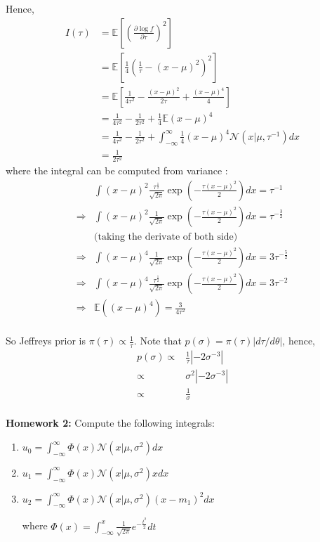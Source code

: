 \documentclass[11pt]{article}
\def\MN{{\mathcal N}}
\def\BE{{\mathbb E}}
\begin{document}
\begin{description}
Hence, 
\[\begin{split}
I(\tau) &= \BE\left[\left( \frac{\partial \log f}{\partial \tau} \right)^2\right]  \\
&= \BE\left[ \frac{1}{4} \left( \frac{1}{\tau} - (x-\mu)^2 \right)^2  \right] \\
&= \BE\left[ \frac{1}{4\tau^2} - \frac{(x - \mu)^2}{2\tau} + \frac{(x-\mu)^4}{4} \right] \\
&= \frac{1}{4\tau^2} - \frac{1}{2\tau^2} + \frac{1}{4}\BE(x-\mu)^4 \\
&= \frac{1}{4\tau^2}-\frac{1}{2\tau^2} + \int^\infty_{-\infty} \frac{1}{4}(x - \mu)^4\MN(x|\mu, \tau^{-1})dx \\
&= \frac{1}{2\tau^2}
\end{split}\]
where the integral can be computed from variance :
\[\begin{split}
& \int (x-\mu)^2\frac{\tau^{\frac{1}{2}}}{\sqrt{2\pi}}\exp(-\frac{\tau(x-\mu)^2}{2})dx =  \tau^{-1} \\
\Longrightarrow & \int (x-\mu)^2\frac{1}{\sqrt{2\pi}}\exp(-\frac{\tau(x-\mu)^2}{2})dx =  \tau^{-\frac{3}{2}} \\ 
& \mbox{(taking the derivate of both side)} \\
\Longrightarrow & \int (x-\mu)^4\frac{1}{\sqrt{2\pi}}\exp(-\frac{\tau(x-\mu)^2}{2})dx =  3\tau^{-\frac{5}{2}} \\ 
\Longrightarrow & \int (x-\mu)^4\frac{\tau^{\frac{1}{2}}}{\sqrt{2\pi}}\exp(-\frac{\tau(x-\mu)^2}{2})dx =  3\tau^{-2} \\ 
\Longrightarrow & \BE\left((x-\mu)^4\right) = \frac{3}{4\tau^2} \\
\end{split}\]

So Jeffreys prior is $\pi(\tau) \propto\frac{1}{\tau}$.
Note that $p(\sigma)=\pi(\tau)|d\tau/d\theta|$, hence, 
\begin{eqnarray*}
p(\sigma)
\propto &\frac{1}{\tau}|-2\sigma^{-3}|\\
\propto & \sigma^2|-2\sigma^{-3}| \\
\propto & \frac{1}{\sigma} \\
\end{eqnarray*}
\end{description}
\textbf{Homework 2:} Compute the following integrals:
\begin{enumerate}
\item $u_0 = \int_{-\infty}^{\infty} \Phi(x) \MN(x|\mu, \sigma^2) dx$
\item $u_1 = \int_{-\infty}^{\infty} \Phi(x) \MN(x|\mu, \sigma^2)x dx$
\item $u_2 = \int_{-\infty}^{\infty} \Phi(x) \MN(x|\mu, \sigma^2)(x-m_1)^2 dx$

where $\Phi(x) = \int_{-\infty}^{x} \frac{1}{\sqrt{2\pi}} e^{-\frac{t^2}{2}} dt$
\end{enumerate}
\end{document}
